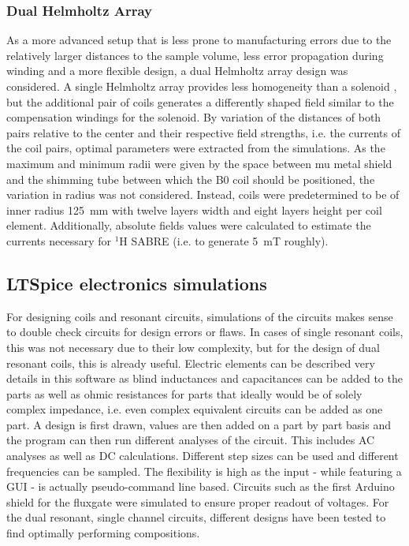         \subsubsection{Dual Helmholtz Array}
        \label{simulations:DualHelmholtzArray}
        As a more advanced setup that is less prone to manufacturing errors due to the relatively larger distances to the sample volume, less error propagation during winding and a more flexible design, a dual Helmholtz array design was considered. A single Helmholtz array provides less homogeneity than a solenoid \cite{bienkowski_techniczne_2015}, but the additional pair of coils generates a differently shaped field similar to the compensation windings for the solenoid. By variation of the distances of both pairs relative to the center and their respective field strengths, i.e. the currents of the coil pairs, optimal parameters were extracted from the simulations. As the maximum and minimum radii were given by the space between mu metal shield and the shimming tube between which the B0 coil should be positioned, the variation in radius was not considered. Instead, coils were predetermined to be of inner radius \SI{125}{\mm} with twelve layers width and eight layers height per coil element.
        Additionally, absolute fields values were calculated to estimate the currents necessary for $^{1}$H SABRE (i.e. to generate \SI{5}{\milli\tesla} roughly).
    \subsection{LTSpice electronics simulations}
        For designing coils and resonant circuits, simulations of the circuits makes sense to double check circuits for design errors or flaws. In cases of single resonant coils, this was not necessary due to their low complexity, but for the design of dual resonant coils, this is already useful. Electric elements can be described very details in this software as blind inductances and capacitances can be added to the parts as well as ohmic resistances for parts that ideally would be of solely complex impedance, i.e. even complex equivalent circuits can be added as one part.
        A design is first drawn, values are then added on a part by part basis and the program can then run different analyses of the circuit. This includes AC analyses as well as DC calculations. Different step sizes can be used and different frequencies can be sampled. The flexibility is high as the input - while featuring a GUI - is actually pseudo-command line based. Circuits such as the first Arduino shield for the fluxgate were simulated to ensure proper readout of voltages. For the dual resonant, single channel circuits, different designs have been tested to find optimally performing compositions.
